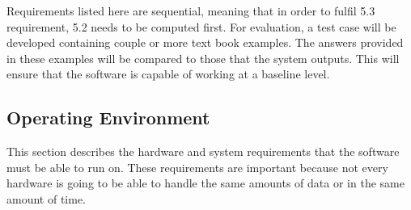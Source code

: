             Requirements listed here are sequential, meaning that in order to fulfil 5.3 requirement, 5.2 needs to be computed first. For evaluation, a test case will be developed containing couple or more text book examples. The answers provided in these examples will be compared to those that the system outputs. This will ensure that the software is capable of working at a baseline level.
        
    \subsection{Operating Environment}
        This section describes the hardware and system requirements that the software must be able to run on. These requirements are important because not every hardware is going to be able to handle the same amounts of data or in the same amount of time.
        
